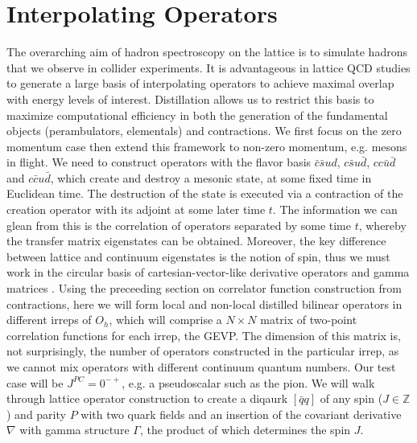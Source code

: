 
\chapter{Interpolating Operators}
\label{sec:ops}

The overarching aim of hadron spectroscopy on the lattice is to simulate hadrons that we observe in collider experiments. It is advantageous in lattice QCD studies to generate a large basis of interpolating operators to achieve maximal overlap with energy levels of interest. Distillation allows us to restrict this basis to maximize computational efficiency in both the generation of the fundamental objects (perambulators, elementals) and contractions. We first focus on the zero momentum case then extend this framework to non-zero momentum, e.g. mesons in flight. We need to construct operators with the flavor basis $\bar c\bar s ud$, $c\bar s u\bar d$, $cc\bar u\bar d$ and $c\bar c u\bar d$, which create and destroy a mesonic state, at some fixed time in Euclidean time. The destruction of the state is executed via a contraction of the creation operator with its adjoint at some later time $t$.  The information we can glean from this is the correlation of operators separated by some time $t$, whereby the transfer matrix eigenstates can be obtained. Moreover, the key difference between lattice and continuum eigenstates is the notion of spin, thus we must work in the circular basis of cartesian-vector-like derivative operators and gamma matrices \cite{Morningstar:2013bda}. Using the preceeding section on correlator function construction from contractions, here we will form local and non-local distilled bilinear operators in different irreps of $O_h$, which will comprise a $N \times N$ matrix of two-point correlation functions for each irrep, the GEVP. The dimension of this matrix is, not surprisingly, the number of operators constructed in the particular irrep, as we cannot mix operators with different continuum quantum numbers. Our test case will be $J^{PC} =0^{-+}$, e.g. a pseudoscalar such as the pion. We will walk through lattice operator construction to create a diqaurk $[\bar{q}q]$ of any spin ($J \in \mathbb{Z}$) and parity $P$ with two quark fields and an insertion of the covariant derivative $\nabla$ with gamma structure $\Gamma$, the product of which determines the spin $J$.  
  

